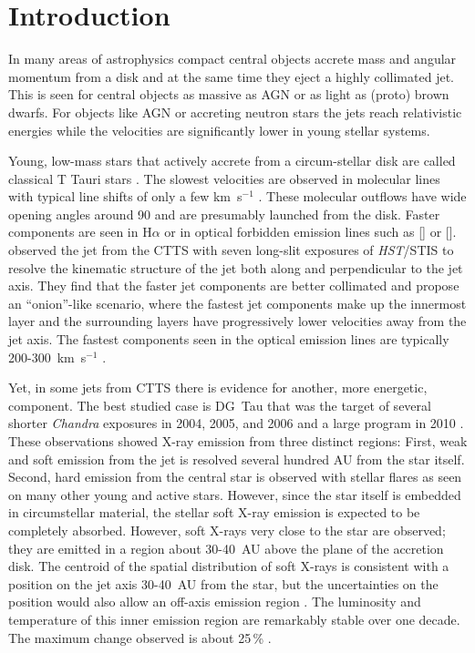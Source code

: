 \section{Introduction} 
In many areas of astrophysics compact central objects accrete mass and angular momentum from a disk and at the same time they eject a highly collimated jet. This is seen for central objects as massive as AGN or as light as (proto) brown dwarfs. For objects like AGN or accreting neutron stars the jets reach relativistic energies while the velocities are significantly lower in young stellar systems. 

Young, low-mass stars that actively accrete from a circum-stellar disk are called classical T Tauri stars \citep[for a review see][]{2013AN....334...67G}. The slowest velocities are observed in molecular lines with typical line shifts of only a few km~s$^{-1}$ \citep{2008ApJ...676..472B}. These molecular outflows have wide opening angles around 90\degree{} \citep[e.g.][]{2013A&A...557A.110S} and are presumably launched from the disk. Faster components are seen in H$\alpha$ or in optical forbidden emission lines such as [] or []. \citet{2000ApJ...537L..49B} observed the jet from the CTTS  with seven long-slit exposures of \emph{HST}/STIS to resolve the kinematic structure of the jet both along and perpendicular to the jet axis. They find that the faster jet components are better collimated and propose an ``onion''-like scenario, where the fastest jet components make up the innermost layer and the surrounding layers have progressively lower velocities away from the jet axis. The fastest components seen in the optical emission lines are typically 200-300~km~s$^{-1}$ \citep{2004Ap&SS.292..651B,2008ApJ...689.1112C,2013A&A...550L...1S}.

Yet, in some jets from CTTS there is evidence for another, more energetic, component. The best studied case is DG~Tau that was the target of several shorter \emph{Chandra} exposures in 2004, 2005, and 2006 and a large program in 2010 \citep{2005ApJ...626L..53G,2008A&A...478..797G,2011ASPC..448..617G}. These observations showed X-ray emission from three distinct regions: First, weak and soft emission from the jet is resolved several hundred AU from the star itself. Second, hard emission from the central star is observed with stellar flares as seen on many other young and active stars. However, since the star itself is embedded in circumstellar material, the stellar soft X-ray emission is expected to be completely absorbed. However, soft X-rays very close to the star are observed; they are emitted in a region about 30-40~AU above the plane of the accretion disk. The centroid of the spatial distribution of soft X-rays is consistent with a position on the jet axis 30-40~AU from the star, but the uncertainties on the position would also allow an off-axis emission region \citep{2008A&A...488L..13S}. The luminosity and temperature of this inner emission region are remarkably stable over one decade. The maximum change observed is about 25\,\% \citep{SchneiderDGTauXray}.

